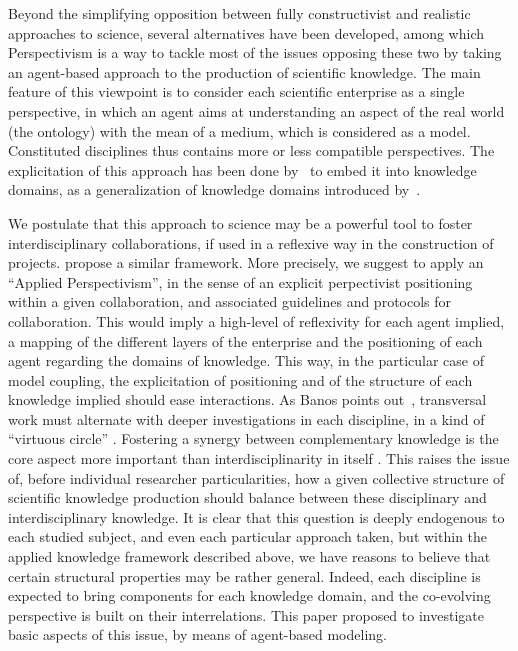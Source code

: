 \documentclass[utf8]{frontiersFPHY} %
\begin{document}
Beyond the simplifying opposition between fully constructivist and realistic approaches to science, several alternatives have been developed, among which Perspectivism \cite{giere2010scientific} is a way to tackle most of the issues opposing these two by taking an agent-based approach to the production of scientific knowledge. The main feature of this viewpoint is to consider each scientific enterprise as a single perspective, in which an agent aims at understanding an aspect of the real world (the ontology) with the mean of a medium, which is considered as a model. Constituted disciplines thus contains more or less compatible perspectives. The explicitation of this approach has been done by~\cite{raimbault2017knowledge} to embed it into knowledge domains, as a generalization of knowledge domains introduced by~\cite{livet2010ontology}.


We postulate that this approach to science may be a powerful tool to foster interdisciplinary collaborations, if used in a reflexive way in the construction of projects. \cite{Ellemers7561} propose a similar framework. More precisely, we suggest to apply an ``Applied Perspectivism'', in the sense of an explicit perpectivist positioning within a given collaboration, and associated guidelines and protocols for collaboration. This would imply a high-level of reflexivity for each agent implied, a mapping of the different layers of the enterprise and the positioning of each agent regarding the domains of knowledge. This way, in the particular case of model coupling, the explicitation of positioning and of the structure of each knowledge implied should ease interactions. As Banos points out~\cite{banos2013pour}, transversal work must alternate with deeper investigations in each discipline, in a kind of ``virtuous circle'' \cite{banos2017knowledge}. Fostering a synergy between complementary knowledge is the core aspect more important than interdisciplinarity in itself \cite{leydesdorff2020measurement}. This raises the issue of, before individual researcher particularities, how a given collective structure of scientific knowledge production should balance between these disciplinary and interdisciplinary knowledge. It is clear that this question is deeply endogenous to each studied subject, and even each particular approach taken, but within the applied knowledge framework described above, we have reasons to believe that certain structural properties may be rather general. Indeed, each discipline is expected to bring components for each knowledge domain, and the co-evolving perspective is built on their interrelations. This paper proposed to investigate basic aspects of this issue, by means of agent-based modeling.
\end{document}
